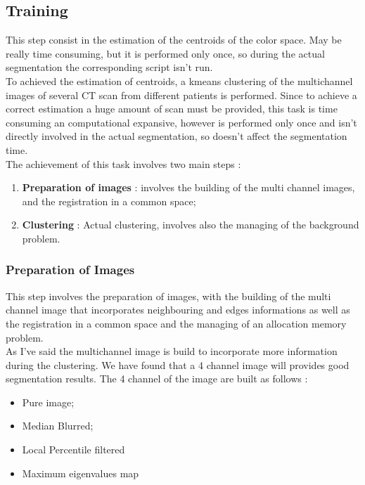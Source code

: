 
	
	\subsection{Training}
	
	This step consist in the estimation of the centroids of the color space. May be  really time consuming, but it is performed only once, so during the actual segmentation the corresponding script isn't run.\\
	To achieved the estimation of centroids, a kmeans clustering of the multichannel images of several CT scan from different patients is performed. 
	Since to achieve a correct estimation a huge amount of scan must be provided, this task is time consuming an computational expansive, however is performed only once and isn't directly involved in the actual segmentation, so doesn't affect the segmentation time.\\
	The achievement of this task involves two main steps : 
	\begin{enumerate}
		\item \textbf{Preparation of images} : involves the building of the multi channel images, and the registration in a common space; 
		\item \textbf{Clustering} : Actual clustering, involves also the managing of the background problem.
	\end{enumerate}

		\subsubsection*{Preparation of Images} 
	
		This step involves the preparation of images, with the building of the multi channel image that incorporates neighbouring and edges informations as well as the registration in a common space and the managing of an allocation memory problem.\\
		
		As I've said the multichannel image is build to incorporate more information during the clustering. We have found that a 4 channel image will provides good segmentation results. The 4 channel of the image are built as follows  : 
		\begin{itemize}
			\item Pure image; 
			\item Median Blurred; 
			\item Local Percentile filtered
			\item Maximum eigenvalues map 
		\end{itemize}
	
